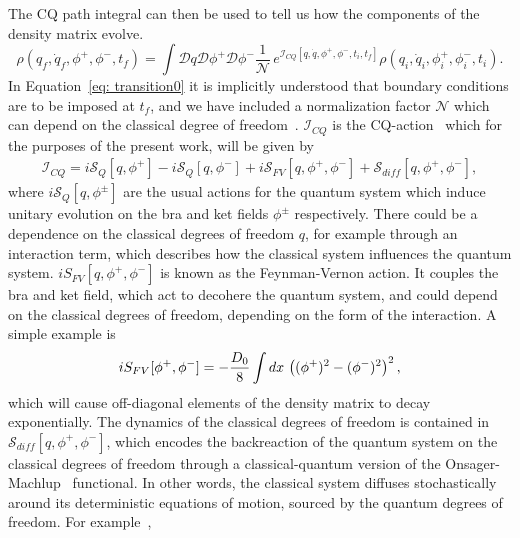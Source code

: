 \documentclass[aps,preprintnumbers,superscriptaddress,longbibliography]{revtex4-1}
\def\z{{q,\dot{q}}}
\begin{document}
The CQ path integral can then be used to tell us how the components of the density matrix evolve. 
\begin{equation}\label{eq: transition0}
 \rho(q_f,\dot{q}_f,\phi^+,\phi^-,t_f)  = 
   \int   \mathcal{D}q \mathcal{D} \phi^+ \mathcal{D} \phi^- \frac{1}{\mathcal{N}}\,e^{\mathcal{I}_{CQ}[\z,\phi^+,\phi^-,t_i,t_f]}   \rho(q_i,\dot{q}_i,\phi^+_i,\phi^-_i, t_i).
\end{equation}
In Equation~\eqref{eq: transition0} it is implicitly understood that boundary conditions are to be imposed at $t_f$, and we have included a normalization factor $\mathcal{N}$ which can depend on the classical degree of freedom~\cite{UCLnorm2023}. $\mathcal{I}_{CQ}$ is the CQ-action~\cite{oppenheim2023path} which for the purposes of the present work, will be given by
\begin{align}
    \mathcal{I}_{CQ} = i\mathcal{S}_Q[q,\phi^+]-i\mathcal{S}_Q[q,\phi^-]+i\mathcal{S}_{FV}[q,\phi^+,\phi^-] + \mathcal{S}_{diff}[q,\phi^+,\phi^-],
\end{align}
where $i\mathcal{S}_{Q}[q,\phi^\pm]$ are the usual actions for the quantum system which induce unitary evolution on the bra and ket fields $\phi^{\pm}$ respectively. There could be a dependence on the classical degrees of freedom $q$, for example through an interaction term, which describes how the classical system influences the quantum system. $iS_{FV}[q,\phi^+,\phi^-]$ is known as the Feynman-Vernon action. It couples the bra and ket field, which act to decohere the quantum system, and could depend on the classical degrees of freedom, depending on the form of the interaction. A simple example is 
\begin{equation}
    iS_{FV}[\phi^+,\phi^-]=-\frac{D_0}{8}\int dx\,\left((\phi^+)^2-(\phi^-)^2\right)^2,
\end{equation}
which will cause off-diagonal elements of the density matrix to decay exponentially. The dynamics of the classical degrees of freedom is contained in $\mathcal{S}_{diff}[q,\phi^+,\phi^-]$, which encodes the backreaction of the quantum system on the classical degrees of freedom through a classical-quantum version of the Onsager-Machlup~\cite{Onsager1953Fluctuations} functional. In other words, the classical system diffuses stochastically around its deterministic equations of motion, sourced by the quantum degrees of freedom. For example~\cite{oppenheim2023covariant},
\end{document}
